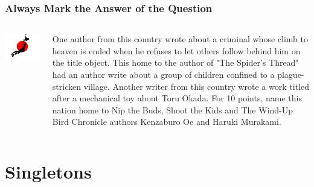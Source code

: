 \documentclass[compress]{beamer}
\begin{document}
\begin{frame}
\frametitle{Always Mark the Answer of the Question}


\begin{columns}
  \includegraphics[width=1.0\linewidth]{qb/instruction_figures/japan}


One author from \alert<2>{this country} wrote about a criminal whose climb to heaven is ended when he refuses to let others follow behind him on the title object. \alert<2>{This home to the author of "The Spider's Thread"} had an author write about a group of children confined to a plague-stricken village. Another writer from \alert<2>{this country} wrote a work titled after a mechanical toy about Toru Okada. For 10 points, name \alert<2>{this nation} home to Nip the Buds, Shoot the Kids and The Wind-Up Bird Chronicle authors Kenzaburo Oe and Haruki Murakami.


\end{columns}

\end{frame}


\section{Singletons}
\end{document}
